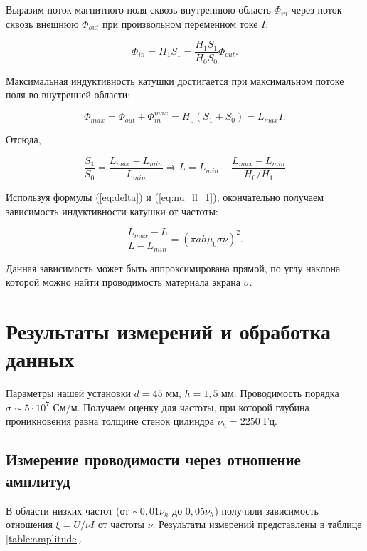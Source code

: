 \documentclass[a4paper, 12pt]{article}
\begin{document}
    Выразим поток магнитного поля сквозь внутреннюю область $\Phi_{in}$ через поток сквозь внешнюю $\Phi_{out}$ при произвольном переменном токе $I$:

    \begin{equation}
        \Phi_{in} = H_1 S_1 = \frac{H_1 S_1}{H_0 S_0} \Phi_{out}.
    \end{equation}

    Максимальная индуктивность катушки достигается при максимальном потоке поля во внутренней области:

    \begin{equation}
        \Phi_{max} = \Phi_{out} + \Phi_{in}^{max} = H_0 (S_1 + S_0) = L_{max} I.
    \end{equation}

    Отсюда, 

    \begin{equation}
        \frac{S_1}{S_0} = \frac{L_{max} - L_{min}}{L_{min}} \Rightarrow L = L_{min} + \frac{L_{max} - L_{min}}{H_0/H_1}
    \end{equation}

    Используя формулы (\ref{eq:delta}) и (\ref{eq:nu_ll_1}), окончательно получаем зависимость индуктивности катушки от частоты:

    \begin{equation}
        \frac{L_{max} - L}{L - L_{min}} = (\pi ah\mu_0\sigma\nu)^2.
    \end{equation}

    Данная зависимость может быть аппроксимирована прямой, по углу наклона которой можно найти проводимость материала экрана $\sigma$.

    
    \section{Результаты измерений и обработка данных}

    Параметры нашей установки $d = 45$ мм, $h=1,5$ мм. Проводимость порядка $\sigma \sim 5\cdot 10^7$ См/м. Получаем оценку для частоты, при которой глубина проникновения равна толщине стенок цилиндра $\nu_h = 2250$ Гц.

    \subsection{Измерение проводимости через отношение амплитуд}

    В области низких частот (от $\sim 0,01 \nu_h$ до $0,05 \nu_h$) получили зависимость отношения $\xi = U/\nu I$ от частоты $\nu$. Результаты измерений представлены в таблице \ref{table:amplitude}.
\end{document}
